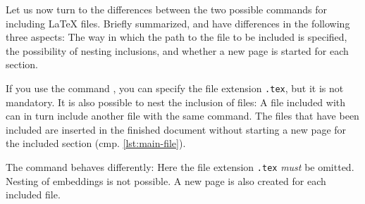 Let us now turn to the differences between the two possible commands for including \LaTeX{} files. Briefly summarized, \texttt{} and \texttt{} have differences in the following three aspects: The way in which the path to the file to be included is specified, the possibility of nesting inclusions, and whether a new page is started for each section.

If you use the command \texttt{}, you can specify the file extension \texttt{.tex}, but it is not mandatory. It is also possible to nest the inclusion of files: A file included with \texttt{} can in turn include another file with the same command. The files that have been included are inserted in the finished document without starting a new page for the included section (cmp. \cref{lst:main-file}).

The command \texttt{} behaves differently: Here the file extension \texttt{.tex} \emph{must} be omitted. Nesting of embeddings is not possible. A new page is also created for each included file.